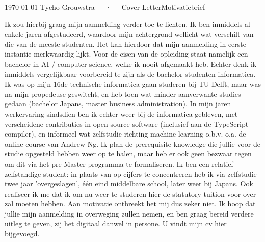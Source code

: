 \documentclass[11pt, a4paper]{awesome-cv}
\newcommand{\langen}[1]{\ifen#1\fi}
\newcommand{\langnl}[1]{\ifnl#1\fi}
\begin{document}
    \langen{}
    \langnl{}
    \makecvheader[R]
    \makecvfooter
      {\today}
      {Tycho Grouwstra~~~·~~~\langen{Cover Letter}\langnl{Motivatiebrief}}
      {}
    \makelettertitle
    
    \begin{cvletter}
    
    Ik zou hierbij graag mijn aanmelding verder toe te lichten.
    Ik ben inmiddels al enkele jaren afgestudeerd, waardoor mijn achtergrond wellicht wat verschilt van die van de meeste studenten.
    Het kan hierdoor dat mijn aanmelding in eerste instantie merkwaardig lijkt.
    \newline\newline
    Voor de eisen van de opleiding staat namelijk een bachelor in AI / computer science, welke ik nooit afgemaakt heb.
    Echter denk ik inmiddels vergelijkbaar voorbereid te zijn als de bachelor studenten informatica.
    \newline\newline
    Ik was op mijn 16de technische informatica gaan studeren bij TU Delft, maar was na mijn propedeuse geswitcht,
    en heb toen wat minder aanverwante studies gedaan (bachelor Japans, master business administration).
    \newline\newline
    In mijn jaren werkervaring sindsdien ben ik echter weer bij de informatica gebleven,
    met verscheidene contributies in open-source software (inclusief aan de TypeScript compiler),
    en informeel wat zelfstudie richting machine learning o.b.v. o.a. de online course van Andrew Ng.
    \newline\newline
    Ik plan de prerequisite knowledge die jullie voor de studie opgesteld hebben weer op te halen,
    maar heb er ook geen bezwaar tegen om dit via het pre-Master programma te formaliseren.
    \newline\newline
    Ik ben een relatief zelfstandige student:
    in plaats van op cijfers te concentreren heb ik via zelfstudie twee jaar
    'overgeslagen', één eind middelbare school, later weer bij Japans.
    Ook realiseer ik me dat ik om nu weer te studeren hier de statutory tuition voor over zal moeten hebben.
    Aan motivatie ontbreekt het mij dus zeker niet.
    \newline\newline
    Ik hoop dat jullie mijn aanmelding in overweging zullen nemen,
    en ben graag bereid verdere uitleg te geven, zij het digitaal danwel in persone.
    U vindt mijn cv hier bijgevoegd.
    
    \end{cvletter}
    \makeletterclosing
    
\end{document}
